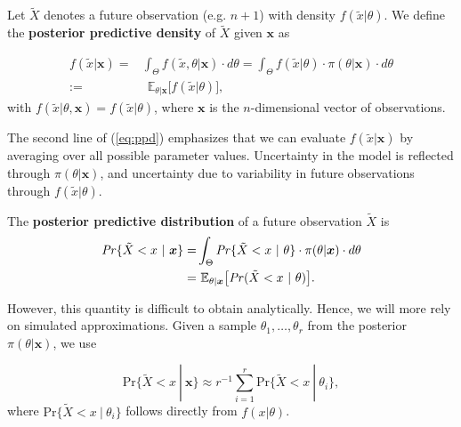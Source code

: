 \begin{definition}
	Let $\tilde{X}$ denotes a future observation (e.g. $n+1$) with density $f(\tilde{x}|\theta)$. We define the \textbf{posterior predictive density} of $\tilde{X}$ given $\boldsymbol{x}$ as 
	
	\begin{equation}\label{eq:ppd}
	\begin{aligned}
	f(\tilde{x}|\boldsymbol{x})
	= & \int_{\Theta}f(\tilde{x},\theta | \boldsymbol{x})\cdot d\theta=\int_{\Theta} f(\tilde{x}|\theta)\cdot \pi (\theta|\boldsymbol{x})\cdot d\theta
	\\ := & \ \ \mathbb{E}_{\theta|\boldsymbol{x}}\big[f(\tilde{x}|\theta)\big],
	\end{aligned}
	\end{equation}
	with $f(\tilde{x}|\theta,\boldsymbol{x})=f(\tilde{x}|\theta)$, where $\boldsymbol{x}$ is the $n$-dimensional vector of observations.
\end{definition}
The second line of (\ref{eq:ppd}) emphasizes that we can evaluate $f(\tilde{x}|\boldsymbol{x})$ by averaging over all possible parameter values.
Uncertainty in the model is reflected through $\pi(\theta|\boldsymbol{x})$, and uncertainty due to variability in future observations through $f(\tilde{x}|\theta)$.

\begin{definition}
	The \textbf{posterior predictive distribution} of a future observation $\tilde{X}$ is
	\begin{equation}\label{eq:ppddd}
	\begin{aligned}
	\text{\emph{Pr}}\{\tilde{X}<x\ | \ \boldsymbol{x}\}= &\int_{\Theta}\text{\emph{Pr}}\{\tilde{X}<x \ | \ \theta \} \cdot \pi(\theta|\boldsymbol{x})\cdot d\theta \\ 
	= & \ \mathbb{E}_{\theta|\boldsymbol{x}}\big[\text{\emph{Pr}}(\tilde{X}<x \ | \ \theta)\big].
	\end{aligned}
	\end{equation}
\end{definition}
However, this quantity is difficult to obtain analytically. Hence, we will more rely on simulated approximations. Given a sample $\theta_1,\dots,\theta_r$ from the posterior $\pi(\theta|\boldsymbol{x})$, we use 

\begin{equation}
\text{Pr}\{\tilde{X}<x\ | \ \boldsymbol{x}\}\approx r^{-1}\sum_{i=1}^r\text{Pr}\{\tilde{X}<x \ | \ \theta_i\},
\end{equation}
where $\text{Pr}\{\tilde{X}<x \ | \ \theta_i\}$ follows directly from $f(x|\theta)$. 

